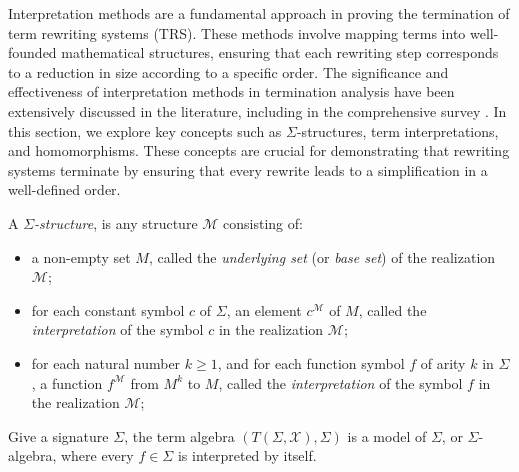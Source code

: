 
Interpretation methods are a fundamental approach in proving the termination of term rewriting systems (TRS). These methods involve mapping terms into well-founded mathematical structures, ensuring that each rewriting step corresponds to a reduction in size according to a specific order. The significance and effectiveness of interpretation methods in termination analysis have been extensively discussed in the literature, including in the comprehensive survey \cite{dersh1987termination}.
In this section, we explore key concepts such as 
$\Sigma$-structures, term interpretations, and homomorphisms. These concepts are crucial for demonstrating that rewriting systems terminate by ensuring that every rewrite leads to a simplification in a well-defined order.

\begin{definition}
  A \textit{$\Sigma$-structure}, is any structure $\mathcal{M}$ consisting of:
  \begin{itemize}
    \item a non-empty set $M$, called the \textit{underlying set} (or \textit{base set}) of the realization $\mathcal{M}$;
    \item for each constant symbol $c$ of $\Sigma$, an element $c^{\mathcal{M}}$ of $M$, called the \textit{interpretation} of the symbol $c$ in the realization $\mathcal{M}$;
    \item for each natural number $k \geq 1$, and for each function symbol $f$ of arity $k$ in $\Sigma$, a function $f^{\mathcal{M}}$ from $M^k$ to $M$, called the \textit{interpretation} of the symbol $f$ in the realization $\mathcal{M}$;
  \end{itemize}
\end{definition}

\begin{example}
  Give a signature $\Sigma$, the term algebra $(T(\Sigma, \mathcal{X}), \Sigma)$ is a model of $\Sigma$, or $\Sigma$-algebra, where every $f \in \Sigma$ is interpreted by itself.
\end{example}

